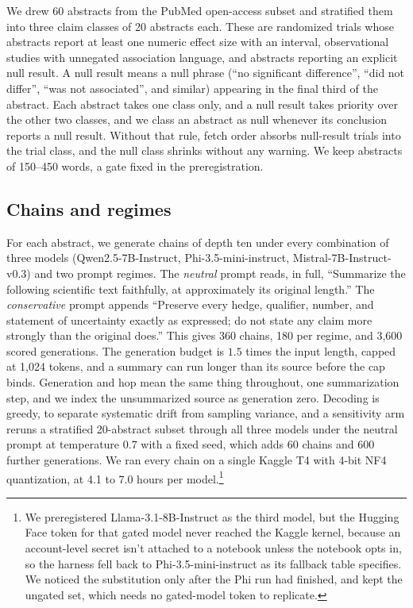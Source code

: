 \documentclass{article}
\begin{document}
We drew 60 abstracts from the PubMed open-access subset and stratified them into three claim classes of 20 abstracts each. These are randomized trials whose abstracts report at least one numeric effect size with an interval, observational studies with unnegated association language, and abstracts reporting an explicit null result. A null result means a null phrase (``no significant difference'', ``did not differ'', ``was not associated'', and similar) appearing in the final third of the abstract. Each abstract takes one class only, and a null result takes priority over the other two classes, and we class an abstract as null whenever its conclusion reports a null result. Without that rule, fetch order absorbs null-result trials into the trial class, and the null class shrinks without any warning. We keep abstracts of 150--450 words, a gate fixed in the preregistration.

\subsection{Chains and regimes}

For each abstract, we generate chains of depth ten under every combination of three models (Qwen2.5-7B-Instruct, Phi-3.5-mini-instruct, Mistral-7B-Instruct-v0.3) and two prompt regimes. The \emph{neutral} prompt reads, in full, ``Summarize the following scientific text faithfully, at approximately its original length.'' The \emph{conservative} prompt appends ``Preserve every hedge, qualifier, number, and statement of uncertainty exactly as expressed; do not state any claim more strongly than the original does.'' This gives 360 chains, 180 per regime, and 3{,}600 scored generations. The generation budget is $1.5$ times the input length, capped at 1{,}024 tokens, and a summary can run longer than its source before the cap binds. Generation and hop mean the same thing throughout, one summarization step, and we index the unsummarized source as generation zero. Decoding is greedy, to separate systematic drift from sampling variance, and a sensitivity arm reruns a stratified 20-abstract subset through all three models under the neutral prompt at temperature $0.7$ with a fixed seed, which adds 60 chains and 600 further generations. We ran every chain on a single Kaggle T4 with 4-bit NF4 quantization, at 4.1 to 7.0 hours per model.\footnote{We preregistered Llama-3.1-8B-Instruct as the third model, but the Hugging Face token for that gated model never reached the Kaggle kernel, because an account-level secret isn't attached to a notebook unless the notebook opts in, so the harness fell back to Phi-3.5-mini-instruct as its fallback table specifies. We noticed the substitution only after the Phi run had finished, and kept the ungated set, which needs no gated-model token to replicate.}
\end{document}
